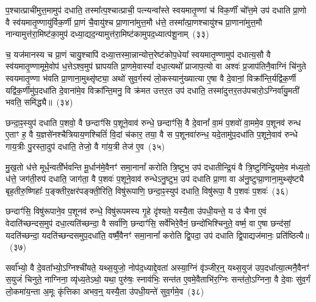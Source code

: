 प॒श्चात्प्राची॑मुत्त॒मामुप॑ दधाति॒ तस्मा᳚त्प॒श्चात्प्राची॒ पत्न्यन्वा᳚स्ते स्वयमातृ॒ण्णां च॑ विक॒र्णीं चो᳚त्त॒मे उप॑ दधाति प्रा॒णो वै स्व॑यमातृ॒ण्णायु॑र्विक॒र्णी प्रा॒णं चै॒वायु॑श्च प्रा॒णाना॑मुत्त॒मौ ध॑त्ते॒ तस्मा᳚त्प्रा॒णश्चायु॑श्च प्रा॒णाना॑मुत्त॒मौ नान्यामुत्त॑रा॒मिष्ट॑का॒मुप॑ दध्या॒द्यद॒न्यामुत्त॑रा॒मिष्ट॑कामुपद॒ध्यात्प॑शू॒नाम्~(३३)

च॒ यज॑मानस्य च प्रा॒णं चायु॒श्चापि॑ दध्या॒त्तस्मा॒न्नान्योत्त॒रेष्ट॑कोप॒धेया᳚ स्वयमातृ॒ण्णामुप॑ दधात्य॒सौ वै स्व॑यमातृ॒ण्णामूमे॒वोप॑ ध॒त्ते\-ऽश्व॒मुप॑ घ्रापयति प्रा॒णमे॒वास्यां᳚ दधा॒त्यथो᳚ प्राजाप॒त्यो वा अश्वः॑ प्र॒जा\-प॑तिनै॒वाग्निं चि॑नुते स्वयमातृ॒ण्णा भ॑वति प्रा॒णाना॒मुथ्सृ॑ष्ट्या॒ अथो॑ सुव॒र्गस्य॑ लो॒कस्यानु॑ख्यात्या ए॒षा वै दे॒वानां॒ विक्रा᳚न्ति॒र्यद्वि॑क॒र्णी यद्वि॑क॒र्णीमु॑प॒दधा॑ति दे॒वाना॑मे॒व विक्रा᳚न्ति॒मनु॒ वि क्र॑मत उत्तर॒त उप॑ दधाति॒ तस्मा॑दुत्तर॒तउ॑पचारो॒\-ऽग्निर्वा॑यु॒मती॑ भवति॒ समि॑द्ध्यै॥~(३४)

{\anuvakamend[{सम्भृ॑तं॒ यन्ना॑क॒सदो॒ यन्ना॑क॒सद॒स्तत्प॑शू॒नामे॒षां वै द्वाविꣳ॑शतिश्च}]}%

छन्दा॒ꣴ॒स्युप॑ दधाति प॒शवो॒ वै छन्दाꣳ॑सि प॒शूने॒वाव॑ रुन्धे॒ छन्दाꣳ॑सि॒ वै दे॒वानां᳚ वा॒मं प॒शवो॑ वा॒ममे॒व प॒शूनव॑ रुन्ध ए॒ताꣳ ह॒ वै य॒ज्ञसे॑नश्चैत्रियाय॒णश्चितिं॑ वि॒दां च॑कार॒ तया॒ वै स प॒शूनवा॑रुन्ध॒ यदे॒तामु॑प॒दधा॑ति प॒शूने॒वाव॑ रुन्धे गाय॒त्रीः पु॒रस्ता॒दुप॑ दधाति॒ तेजो॒ वै गा॑य॒त्री तेज॑ ए॒व~(३५)

मु॒ख॒तो ध॑त्ते मूर्ध॒न्वती᳚र्भवन्ति मू॒र्धान॑मे॒वैनꣳ॑ समा॒नानां᳚ करोति त्रि॒ष्टुभ॒ उप॑ दधातीन्द्रि॒यं वै त्रि॒ष्टुगि॑न्द्रि॒यमे॒व म॑ध्य॒तो ध॑त्ते॒ जग॑ती॒रुप॑ दधाति॒ जाग॑ता॒ वै प॒शवः॑ प॒शूने॒वाव॑ रुन्धे\-ऽनु॒ष्टुभ॒ उप॑ दधाति प्रा॒णा वा अ॑नु॒ष्टुप्प्रा॒णाना॒मुथ्सृ॑ष्ट्यै बृह॒तीरु॒ष्णिहाः᳚ प॒ङ्क्तीर॒क्षर॑पङ्क्ती॒रिति॒ विषु॑रूपाणि॒ छन्दा॒ꣴ॒स्युप॑ दधाति॒ विषु॑रूपा॒ वै प॒शवः॑ प॒शवः॑~(३६)

छन्दाꣳ॑सि॒ विषु॑रूपाने॒व प॒शूनव॑ रुन्धे॒ विषु॑रूपमस्य गृ॒हे दृ॑श्यते॒ यस्यै॒ता उ॑पधी॒यन्ते॒ य उ॑ चैना ए॒वं वेदाति॑च्छन्दस॒मुप॑ दधा॒त्यति॑च्छन्दा॒ वै सर्वा॑णि॒ छन्दाꣳ॑सि॒ सर्वे॑भिरे॒वैनं॒ छन्दो॑भिश्चिनुते॒ वर्ष्म॒ वा ए॒षा छन्द॑सां॒ यदति॑च्छन्दा॒ यदति॑च्छन्दसमुप॒दधा॑ति॒ वर्ष्मै॒वैनꣳ॑ समा॒नानां᳚ करोति द्वि॒पदा॒ उप॑ दधाति द्वि॒पाद्यज॑मानः॒ प्रति॑ष्ठित्यै॥~(३७)

{\anuvakamend[{तेज॑ ए॒व प॒शवः॑ प॒शवो॒ यज॑मान॒ एक॑ञ्च}]}%

सर्वा᳚भ्यो॒ वै दे॒वता᳚भ्यो॒\-ऽग्निश्ची॑यते॒ यथ्स॒युजो॒ नोप॑द॒ध्याद्दे॒वता॑ अस्या॒ग्निं वृ॑ञ्जीर॒न्॒ यथ्स॒युज॑ उप॒दधा᳚त्या॒त्मनै॒वैनꣳ॑ स॒युजं॑ चिनुते॒ नाग्निना॒ व्यृ॑ध्य॒ते\-ऽथो॒ यथा॒ पुरु॑षः॒ स्नाव॑भिः॒ सन्त॑त ए॒वमे॒वैताभि॑र॒ग्निः सन्त॑तो॒\-ऽग्निना॒ वै दे॒वाः सु॑व॒र्गं लो॒कमा॑य॒न्ता अ॒मूः कृ॑त्तिका अभव॒न्॒ यस्यै॒ता उ॑पधी॒यन्ते॑ सुव॒र्गमे॒व~(३८)

